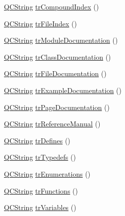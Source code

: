 \begin{DoxyCompactItemize}
\item 
\mbox{\hyperlink{class_q_c_string}{Q\+C\+String}} \mbox{\hyperlink{class_translator_italian_af48d3951c706847a9bd4d8c5b8e0cb3f}{tr\+Compound\+Index}} ()
\item 
\mbox{\hyperlink{class_q_c_string}{Q\+C\+String}} \mbox{\hyperlink{class_translator_italian_a48041d4a761fce034b2b088caec7e357}{tr\+File\+Index}} ()
\item 
\mbox{\hyperlink{class_q_c_string}{Q\+C\+String}} \mbox{\hyperlink{class_translator_italian_a329af69d2c37dc2f4299ca6ee24442e6}{tr\+Module\+Documentation}} ()
\item 
\mbox{\hyperlink{class_q_c_string}{Q\+C\+String}} \mbox{\hyperlink{class_translator_italian_a16c3f6b4b73775d83e0c91d2b43bdc8a}{tr\+Class\+Documentation}} ()
\item 
\mbox{\hyperlink{class_q_c_string}{Q\+C\+String}} \mbox{\hyperlink{class_translator_italian_a4fca960d64e17c1ac879eba39ceca2eb}{tr\+File\+Documentation}} ()
\item 
\mbox{\hyperlink{class_q_c_string}{Q\+C\+String}} \mbox{\hyperlink{class_translator_italian_a67063fffd51200830a42a7466c085d39}{tr\+Example\+Documentation}} ()
\item 
\mbox{\hyperlink{class_q_c_string}{Q\+C\+String}} \mbox{\hyperlink{class_translator_italian_a639a67244650596600ad6ed801423df5}{tr\+Page\+Documentation}} ()
\item 
\mbox{\hyperlink{class_q_c_string}{Q\+C\+String}} \mbox{\hyperlink{class_translator_italian_aea988204498931a93fec179446d44322}{tr\+Reference\+Manual}} ()
\item 
\mbox{\hyperlink{class_q_c_string}{Q\+C\+String}} \mbox{\hyperlink{class_translator_italian_a362f3533416351e0a08497f83d936797}{tr\+Defines}} ()
\item 
\mbox{\hyperlink{class_q_c_string}{Q\+C\+String}} \mbox{\hyperlink{class_translator_italian_abc9e900ace289b1fa2eaa1e3744b61d6}{tr\+Typedefs}} ()
\item 
\mbox{\hyperlink{class_q_c_string}{Q\+C\+String}} \mbox{\hyperlink{class_translator_italian_a937d1073caa1dfcc87dd89e1eaff865b}{tr\+Enumerations}} ()
\item 
\mbox{\hyperlink{class_q_c_string}{Q\+C\+String}} \mbox{\hyperlink{class_translator_italian_a11d75c58403541408a7cf01827366a69}{tr\+Functions}} ()
\item 
\mbox{\hyperlink{class_q_c_string}{Q\+C\+String}} \mbox{\hyperlink{class_translator_italian_a35a0b0e739fac94691b7d054f016b25b}{tr\+Variables}} ()
\item 

\end{DoxyCompactItemize}
